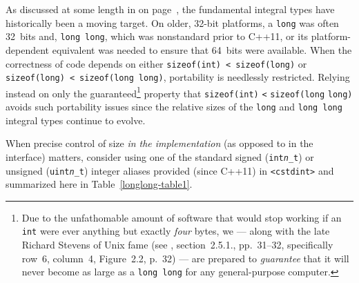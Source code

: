 As discussed at some length in {\it{}} on page~\pageref{longlong-appendix}, the
fundamental integral types have historically been a moving target. On
older, 32-bit platforms, a \lstinline!long! was often 32~bits and, \lstinline!long!~\lstinline!long!, which was nonstandard prior to C++11, or its platform-dependent equivalent was needed to ensure that 64~bits were
available. When the correctness of code depends on either
\lstinline!sizeof(int)!~\lstinline!<!~\lstinline!sizeof(long)! or
\lstinline!sizeof(long)!~\lstinline!<!~\lstinline!sizeof(long!~\lstinline!long)!,
portability is needlessly restricted. Relying instead on only the
guaranteed{\cprotect\footnote{Due to the unfathomable amount of software
that would stop working if an \lstinline!int! were ever anything but
exactly \emph{four} bytes, we --- along with the late Richard Stevens
  of Unix fame (see \cite{stevens93}, section~2.5.1., pp.~31--32, specifically row~6, column~4, Figure~2.2, p.~32) --- are prepared
  to \emph{guarantee} that it will never become as large as a
  \lstinline!long!~\lstinline!long! for any general-purpose computer.}}
property that
\lstinline!sizeof(int)! \lstinline!<! \lstinline!sizeof(long! \lstinline!long)!
avoids such portability issues since the relative sizes of the \lstinline!long! and \lstinline!long!~\lstinline!long! integral
types continue to evolve.

When precise control of size \emph{in the implementation} (as opposed to
in the interface) matters, consider using one of the standard signed
(\texttt{int{\itshape n}\_t}) or unsigned (\texttt{uint{\itshape n}\_t}) integer
aliases provided (since C++11) in \lstinline!<cstdint>! and
summarized here in Table~\ref{longlong-table1}.\newpage

